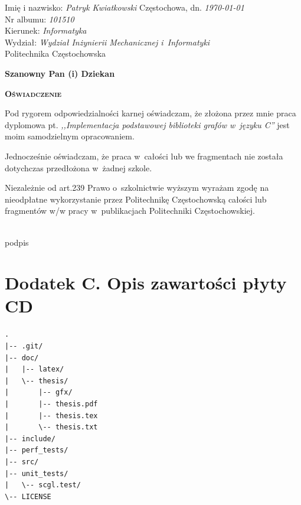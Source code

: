 \documentclass[a4paper,12pt,polish,twoside,openright]{thesis}
\begin{document}
Imię i nazwisko: \emph{Patryk Kwiatkowski} \hfill Częstochowa, dn. \emph{\today} \\
Nr albumu: \emph{101510} \\
Kierunek: \emph{Informatyka} \\
Wydział: \emph{Wydział Inżynierii Mechanicznej i~Informatyki} \\

\vfill
Politechnika Częstochowska
\vfill
\begin{flushright}
\textbf{Szanowny Pan (i) Dziekan} \hspace*{1cm}
\end{flushright}
\vfill
\begin{center}
\textbf{\textsc{\large Oświadczenie}}
\end{center}
\vfill

Pod rygorem odpowiedzialności karnej oświadczam, że złożona przez mnie praca dyplomowa pt. \emph{,,Implementacja podstawowej biblioteki grafów w~języku C''} jest moim samodzielnym opracowaniem.

Jednocześnie oświadczam, że praca w~całości lub we fragmentach nie została dotychczas przedłożona w~żadnej szkole.

Niezależnie od art.239 Prawo o~szkolnictwie wyższym wyrażam zgodę na nieodpłatne wykorzystanie przez Politechnikę Częstochowską całości lub fragmentów w/w pracy w~publikacjach Politechniki Częstochowskiej.

\vfill

\begin{center}
	\begin{minipage}{0.7\textwidth}
		\begin{flushright}
		\begin{minipage}{0.4\textwidth}
			\begin{center}
			\dotfill\\
			podpis
			\end{center}
		\end{minipage}
		\end{flushright}
	\end{minipage}
\end{center}

\setlength{\parskip}{\oldparskip}

\chapter*{Dodatek C. Opis zawartości płyty CD}
\label{chap:cd}
\begin{lstlisting}[style=coden,caption={Struktura plików zamieszczonych na płycie CD}]
.
|-- .git/
|-- doc/
|   |-- latex/
|   \-- thesis/
|       |-- gfx/
|       |-- thesis.pdf
|       |-- thesis.tex
|       \-- thesis.txt
|-- include/
|-- perf_tests/
|-- src/
|-- unit_tests/
|   \-- scgl.test/
\-- LICENSE
\end{lstlisting}
\end{document}
